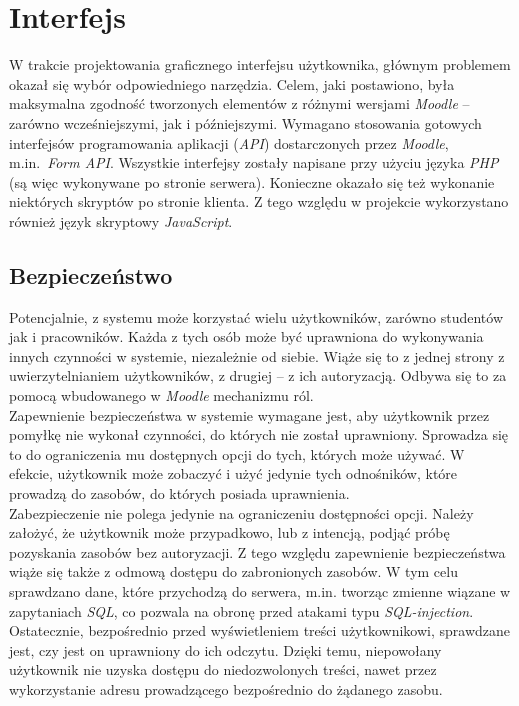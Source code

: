 \section{Interfejs}
\label{Chapter65}

W trakcie projektowania graficznego interfejsu użytkownika, głównym problemem okazał się wybór odpowiedniego narzędzia. Celem, jaki postawiono, była maksymalna zgodność tworzonych elementów z różnymi wersjami \textit{Moodle} -- zarówno wcześniejszymi, jak i późniejszymi. Wymagano stosowania gotowych interfejsów programowania aplikacji (\textit{API}) dostarczonych przez \textit{Moodle}, m.in.~\textit{Form API}. Wszystkie interfejsy zostały napisane przy użyciu języka \textit{PHP} (są więc wykonywane po stronie serwera). Konieczne okazało się też wykonanie niektórych skryptów po stronie klienta. Z tego względu w projekcie wykorzystano również język skryptowy \textit{JavaScript}.

\subsection{Bezpieczeństwo}
\label{Chapter651}

Potencjalnie, z systemu może korzystać wielu użytkowników, zarówno studentów jak i pracowników. Każda z tych osób może być uprawniona do wykonywania innych czynności w systemie, niezależnie od siebie. Wiąże się to z jednej strony z uwierzytelnianiem użytkowników, z drugiej -- z ich autoryzacją. Odbywa się to za pomocą wbudowanego w \textit{Moodle} mechanizmu ról. \\

Zapewnienie bezpieczeństwa w systemie wymagane jest, aby użytkownik przez pomyłkę nie wykonał czynności, do których nie został uprawniony. Sprowadza się to do ograniczenia mu dostępnych opcji do tych, których może używać. W efekcie, użytkownik może zobaczyć i użyć jedynie tych odnośników, które prowadzą do zasobów, do których posiada uprawnienia. \\

Zabezpieczenie nie polega jedynie na ograniczeniu dostępności opcji. Należy założyć, że użytkownik może przypadkowo, lub z intencją, podjąć próbę pozyskania zasobów bez autoryzacji. Z tego względu zapewnienie bezpieczeństwa wiąże się także z odmową dostępu do zabronionych zasobów. W tym celu sprawdzano dane, które przychodzą do serwera, m.in. tworząc zmienne wiązane w zapytaniach \textit{SQL}, co pozwala na obronę przed atakami typu \textit{SQL-injection}. Ostatecznie, bezpośrednio przed wyświetleniem treści użytkownikowi, sprawdzane jest, czy jest on uprawniony do ich odczytu. Dzięki temu, niepowołany użytkownik nie uzyska dostępu do niedozwolonych treści, nawet przez wykorzystanie adresu prowadzącego bezpośrednio do żądanego zasobu.